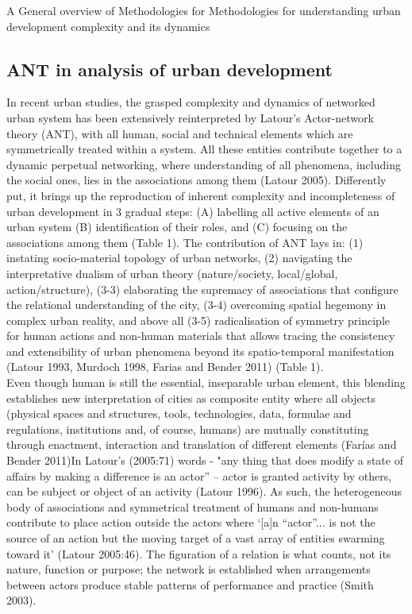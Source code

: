 \documentclass[11pt]{report}
\begin{document}
A General overview of Methodologies for 
Methodologies for understanding urban development complexity and its dynamics

\subsection{ANT in analysis of urban development}

In recent urban studies, the grasped complexity and dynamics of networked urban system has been extensively reinterpreted by Latour’s Actor-network theory (ANT), with all human, social and technical elements which are symmetrically treated within a system. All these entities contribute together to a dynamic perpetual networking, where understanding of all phenomena, including the social ones, lies in the associations among them  (Latour 2005). Differently put, it brings up the reproduction of inherent complexity and incompleteness of urban development in 3 gradual steps:  (A) labelling all active elements of an urban system (B) identification of their roles, and (C) focusing on the associations among them (Table 1). The contribution of ANT lays in: (1) instating socio-material topology of urban networks, (2) navigating the interpretative dualism of urban theory (nature/society, local/global, action/structure), (3-3) elaborating the supremacy of associations that configure the relational understanding of the city, (3-4) overcoming spatial hegemony in complex urban reality, and above all (3-5) radicalisation of  symmetry principle for human  actions  and non-human  materials  that  allows tracing the consistency and extensibility of urban phenomena beyond its spatio-temporal manifestation  (Latour 1993, Murdoch 1998, Farias and Bender 2011) (Table 1).
\\
Even though human is still the essential, inseparable urban element, this blending establishes new interpretation of cities as composite entity where all objects (physical spaces and structures, tools, technologies, data, formulae and regulations, institutions and, of course, humans) are mutually constituting through enactment, interaction and translation of different elements (Farías and Bender 2011)In  Latour’s (2005:71) words - "any thing that does modify a state of affairs by making a difference is an actor” – actor is granted activity by others, can be subject or object of an activity  (Latour 1996). As such, the heterogeneous body of associations and symmetrical treatment of humans and non-humans contribute to place action outside the actors where ‘[a]n “actor”... is not the source of an action but the moving target of a vast array of entities swarming toward it’ (Latour 2005:46). The figuration of a relation is what counts, not its nature, function or purpose; the network is established when arrangements between actors produce stable patterns of performance and practice (Smith 2003).
\end{document}

